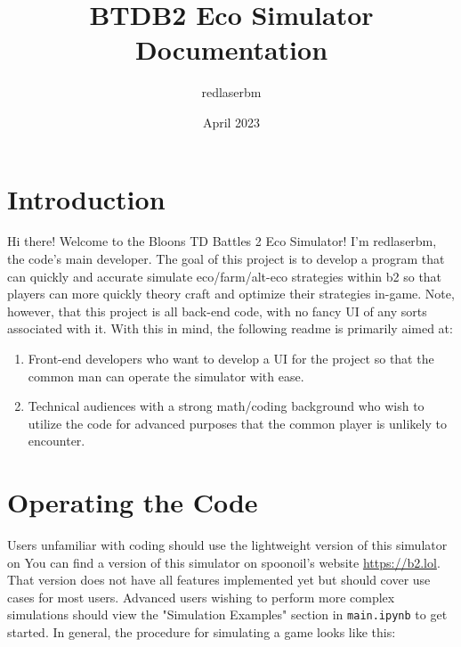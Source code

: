 \documentclass[12pt,letterpaper]{article}
\theoremstyle{remark}
\theoremstyle{plain}
\begin{document}
\title{BTDB2 Eco Simulator Documentation}
\author{redlaserbm}
\date{April 2023}
\maketitle

\section{Introduction}

Hi there! Welcome to the Bloons TD Battles 2 Eco Simulator! I'm redlaserbm, the code's main developer. The goal of this project is to develop a program that can quickly and accurate simulate eco/farm/alt-eco strategies within b2 so that players can more quickly theory craft and optimize their strategies in-game. Note, however, that this project is all back-end code, with no fancy UI of any sorts associated with it. With this in mind, the following readme is primarily aimed at:

\begin{enumerate}
    \item Front-end developers who want to develop a UI for the project so that the common man can operate the simulator with ease.
    \item Technical audiences with a strong math/coding background who wish to utilize the code for advanced purposes that the common player is unlikely to encounter.
\end{enumerate}


\section{Operating the Code}

Users unfamiliar with coding should use the lightweight version of this simulator on  You can find a version of this simulator on spoonoil's website \url{https://b2.lol}. That version does not have all features implemented yet but should cover use cases for most users. Advanced users wishing to perform more complex simulations should view the "Simulation Examples" section in \texttt{main.ipynb} to get started. In general, the procedure for simulating a game looks like this:
\end{document}
